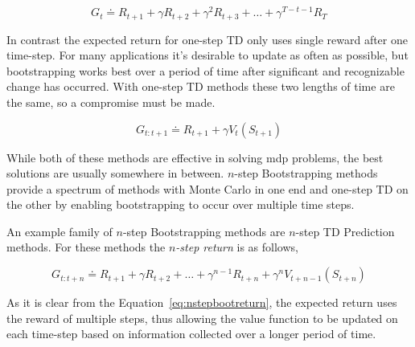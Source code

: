 \begin{equation}
  G_t \doteq R_{t+1} + \gamma R_{t+2} + \gamma^2 R_{t+3} + \ldots + \gamma^{T-t-1}R_T
\end{equation}

In contrast the expected return for one-step TD only uses single reward after one time-step. For many applications it's desirable to update as often as possible, but bootstrapping works best over a period of time after significant and recognizable change has occurred. With one-step TD methods these two lengths of time are the same, so a compromise must be made.

\begin{equation}
  G_{t:t+1} \doteq R_{t+1} + \gamma V_t(S_{t+1})
\end{equation}

While both of these methods are effective in solving \gls{mdp} problems, the best solutions are usually somewhere in between. $n$-step Bootstrapping methods provide a spectrum of methods with Monte Carlo in one end and one-step TD on the other by enabling bootstrapping to occur over multiple time steps.

An example family of $n$-step Bootstrapping methods are $n$-step TD Prediction methods. For these methods the \emph{$n$-step return} is as follows,

\begin{equation}
  G_{t:t+n} \doteq R_{t+1} + \gamma R_{t+2} + \ldots + \gamma^{n-1} R_{t+n} + \gamma^n V_{t+n-1}(S_{t+n})
  \label{eq:nstepbootreturn}
\end{equation}

As it is clear from the Equation~\ref{eq:nstepbootreturn}, the expected return uses the reward of multiple steps, thus allowing the value function to be updated on each time-step based on information collected over a longer period of time.
